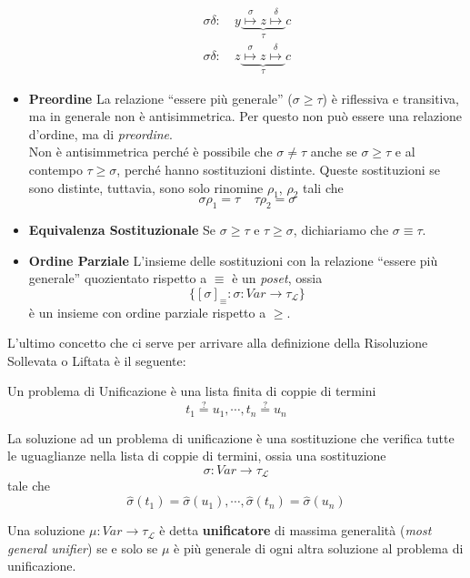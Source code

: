 \begin{itemize}
\begin{align*}
    \sigma\delta: &\ y \underbrace{\stackrel \sigma \mapsto z \stackrel \delta \mapsto}_{\tau} c \\
    \sigma\delta: &\ z \underbrace{\stackrel \sigma \mapsto z \stackrel \delta \mapsto}_{\tau} c
    \end{align*}
  \item{\textbf{Preordine}} La relazione ``essere più generale'' ($\sigma \geq \tau$) è riflessiva e transitiva, ma in generale non è antisimmetrica. Per questo non può essere una relazione d'ordine, ma di \textit{preordine}. \\
    Non è antisimmetrica perché è possibile che $\sigma \neq \tau$ anche se $\sigma \geq \tau$ e al contempo $\tau \geq \sigma$, perché hanno sostituzioni distinte. Queste sostituzioni se sono distinte, tuttavia, sono solo rinomine $\rho_1$, $\rho_2$ tali che 
    $$
    \sigma\rho_1 = \tau ~~~~~ \tau\rho_2 = \sigma
    $$
  \item{\textbf{Equivalenza Sostituzionale}} Se $\sigma \geq \tau$ e $\tau \geq \sigma$, dichiariamo che $\sigma \equiv \tau$.

  \item{\textbf{Ordine Parziale}} L'insieme delle sostituzioni con la relazione ``essere più generale'' quozientato rispetto a $\equiv$ è un \textit{poset}, ossia
  $$
  \{[\sigma]_{\equiv}: \sigma : Var \rightarrow \tau_\mathscr{L}\} 
  $$
  è un insieme con ordine parziale rispetto a $\geq$.
\end{itemize}

L'ultimo concetto che ci serve per arrivare alla definizione della Risoluzione 
Sollevata o Liftata è il seguente: 
\begin{defi}[Unificazione]
        Un problema di Unificazione è una lista finita di coppie di termini 
        $$
        t_1 \stackrel{?}{=} u_1, \cdots, t_n \stackrel{?}{=} u_n
        $$
\end{defi}
La soluzione ad un problema di unificazione è una sostituzione che verifica tutte 
le uguaglianze nella lista di coppie di termini, ossia una sostituzione 
$$
\sigma: Var \rightarrow \tau_\mathscr{L}
$$
tale che 
$$
\hat{\sigma}(t_1) = \hat{\sigma}(u_1), \cdots, \hat{\sigma}(t_n) = \hat{\sigma}(u_n)
$$
\begin{defi}[Unificatore]
  Una soluzione $\mu: Var \rightarrow \tau_\mathscr{L}$ è detta \textbf{unificatore} di massima generalità (\textit{most general unifier}) se e solo se $\mu$ è più generale di ogni altra soluzione al problema di unificazione.
\end{defi}

